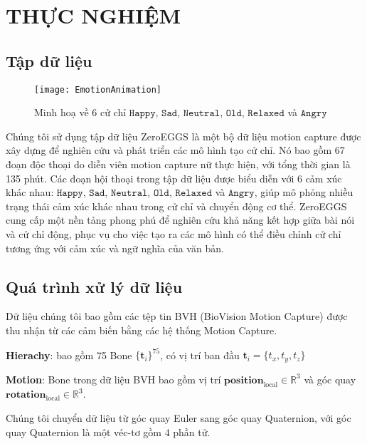 \chapter{THỰC NGHIỆM}
\label{Chapter4}

\section{Tập dữ liệu}

\setcounter{figure}{12}
\begin{figure}
	\centering
	\texttt{[image: EmotionAnimation]}
	\caption{Minh hoạ về 6 cử chỉ $\texttt{Happy}$, $\texttt{Sad}$, $\texttt{Neutral}$, $\texttt{Old}$, $\texttt{Relaxed}$ và $\texttt{Angry}$}
\end{figure}

Chúng tôi sử dụng tập dữ liệu ZeroEGGS \cite{ghorbani2022zeroeggszeroshotexamplebasedgesture} là một bộ dữ liệu motion capture được xây dựng để nghiên cứu và phát triển các mô hình tạo cử chỉ. Nó bao gồm 67 đoạn độc thoại do diễn viên motion capture nữ thực hiện, với tổng thời gian là 135 phút. Các đoạn hội thoại trong tập dữ liệu được biểu diễn với 6 cảm xúc khác nhau: $\texttt{Happy}$, $\texttt{Sad}$, $\texttt{Neutral}$, $\texttt{Old}$, $\texttt{Relaxed}$ và $\texttt{Angry}$, giúp mô phỏng nhiều trạng thái cảm xúc khác nhau trong cử chỉ và chuyển động cơ thể. ZeroEGGS cung cấp một nền tảng phong phú để nghiên cứu khả năng kết hợp giữa bài nói và cử chỉ động, phục vụ cho việc tạo ra các mô hình có thể điều chỉnh cử chỉ tương ứng với cảm xúc và ngữ nghĩa của văn bản.

\section{Quá trình xử lý dữ liệu}

Dữ liệu chúng tôi bao gồm các tệp tin BVH (BioVision Motion Capture) được thu nhận từ các cảm biến bằng các hệ thống Motion Capture. 


\textbf{Hierachy}: bao gồm 75 Bone $\{ \mathbf{t}_i \}^{75} $, có vị trí ban đầu  $\mathbf{t}_{i} = \{t_x, t_y, t_z\}$


\vspace{5pt}


\textbf{Motion}:
Bone trong dữ liệu BVH bao gồm vị trí $\mathbf{position}_{\operatorname{local}}  \in \mathbb{R}^{3}$ và góc quay $\mathbf{rotation}_{\operatorname{local}} \in \mathbb{R}^{3}$.

Chúng tôi chuyển dữ liệu từ góc quay Euler sang góc quay Quaternion, với góc quay Quaternion là một véc-tơ gồm 4 phần tử.

